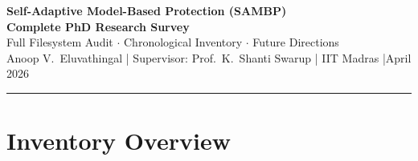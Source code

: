 \documentclass[11pt,a4paper]{article}
\begin{document}
\begin{center}
  {\LARGE\bfseries\color{sambpblue}
    Self-Adaptive Model-Based Protection (SAMBP)\\[4pt]
    Complete PhD Research Survey}\\[10pt]
  {\large Full Filesystem Audit $\cdot$ Chronological Inventory $\cdot$ Future Directions}\\[8pt]
  {\normalsize Anoop V.\ Eluvathingal \quad|\quad
    Supervisor: Prof.\ K.\ Shanti Swarup \quad|\quad
    IIT Madras \quad|\quad April 2026}
\end{center}

\vspace{4pt}\rule{\linewidth}{1.2pt}\vspace{6pt}

\begin{abstract}
\noindent
This document provides a \textbf{complete, filesystem-verified} chronological
survey of all technical work in the SAMBP PhD thesis project.
The previous survey was incomplete, having been built from session memory rather
than a live directory scan. This version is based on a full traversal of
\texttt{/root/phd\_thesis}, including all 55 technical reports (TR-3 through
TR-55 for the SG/IBR SyncOC/87L/87B/Distance/Microgrid/Digital-Twin/ML chain),
four confirmed IEEE journal papers, six internal SyncOC sub-reports, four
additional IBR reports (TR-56, TR-57, TR-58, TR-62), the thesis submission
skeleton, and the new\_thesis chapter drafts.
Git tracking status is noted for every major item.
\end{abstract}

\vspace{4pt}
\tableofcontents

\newpage
\section{Inventory Overview}
\end{document}
